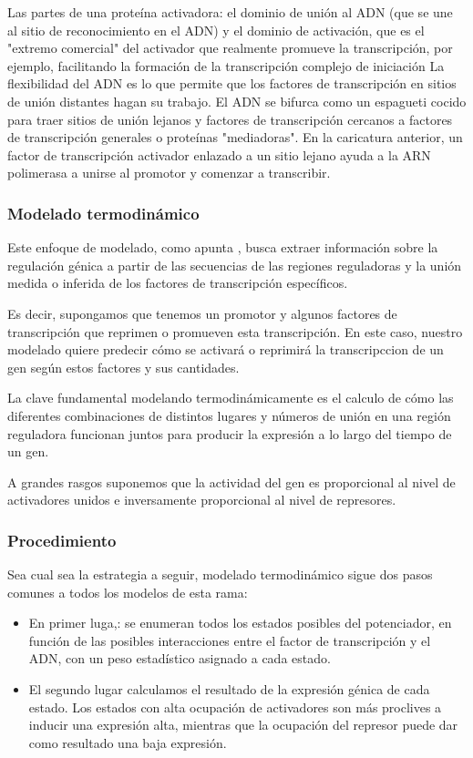  Las partes de una proteína activadora: el dominio de unión al ADN (que se une al sitio de reconocimiento en el ADN) y el dominio de activación, que es el "extremo comercial" del activador que realmente promueve la transcripción, por ejemplo, facilitando la formación de la transcripción complejo de iniciación
 La flexibilidad del ADN es lo que permite que los factores de transcripción en sitios de unión distantes hagan su trabajo. El ADN se bifurca como un espagueti cocido para traer sitios de unión lejanos y factores de transcripción cercanos a factores de transcripción generales o proteínas "mediadoras".
 En la caricatura anterior, un factor de transcripción activador enlazado a un sitio lejano ayuda a la ARN polimerasa a unirse al promotor y comenzar a transcribir.
 
 \subsubsection{Modelado termodinámico}
 
 Este enfoque de modelado, como apunta \cite{ay2011mathematical}, busca extraer información sobre la regulación génica a partir de las secuencias de las regiones reguladoras y la unión medida o inferida de los factores de transcripción específicos.
 
 Es decir, supongamos que tenemos un promotor y algunos factores de transcripción que reprimen o promueven esta transcripción. En este caso, nuestro modelado quiere predecir cómo se activará o reprimirá la transcripccion de un gen según estos factores y sus cantidades.
 
 
 La clave fundamental modelando termodinámicamente es el calculo de cómo las diferentes combinaciones de distintos lugares y números de unión en una región reguladora funcionan juntos para producir la expresión a lo largo del tiempo de un gen.
 
 A grandes rasgos suponemos que la actividad del gen es proporcional al nivel de activadores unidos e inversamente proporcional al nivel de represores.
 
 \subsubsection{Procedimiento}
 
  Sea cual sea la estrategia a seguir, modelado termodinámico sigue dos pasos comunes a todos los modelos de esta rama:
  \begin{itemize}
  	\item En primer luga,: se enumeran todos los estados posibles del potenciador, en función de las posibles interacciones entre el factor de transcripción y el ADN, con un peso estadístico asignado a cada estado.
  	\item  El segundo lugar calculamos el resultado de la expresión génica de cada estado. Los estados con alta ocupación de activadores son más proclives a inducir una expresión alta, mientras que la ocupación del represor puede dar como resultado una baja expresión.
  \end{itemize}
  
